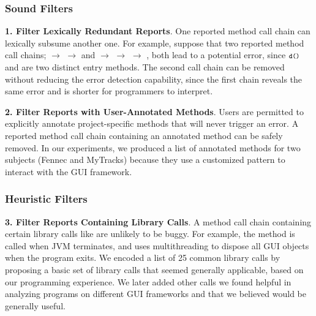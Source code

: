 





\subsubsection{Sound Filters}

\textbf{1. Filter Lexically Redundant Reports}. One reported method call
chain can lexically subsume another one. For example, suppose that two
reported method call chains;  $\rightarrow$ 
$\rightarrow$  and 
 $\rightarrow$  $\rightarrow$  $\rightarrow$ ,
both lead to a potential error, since $\CodeIn{d()}$ and 
are two distinct entry methods. The second call chain can
be removed without reducing the error detection capability, since
the first chain reveals the same error and is shorter 
for programmers to interpret.


\textbf{2. Filter Reports with User-Annotated Methods}. Users are
permitted to explicitly annotate project-specific methods
that will never trigger an error.
A reported method call chain containing an annotated  method
can be safely removed. In our experiments, we produced a list of \filternum
annotated methods for two subjects (Fennec and MyTracks) because they use a customized
pattern to interact with the GUI framework.



\subsubsection{Heuristic Filters}

\textbf{3. Filter Reports Containing Library Calls}. A
method call chain containing certain library calls
like  are unlikely to
be buggy. For example, the 
method is called when JVM terminates, and uses multithreading
to dispose all GUI objects when the program exits.
We encoded a list of 25 common library calls by proposing
a basic set of library calls that seemed %
generally applicable, based on our programming experience.
We later added other calls we found helpful in analyzing
programs on different GUI frameworks and that we believed would be generally useful.


